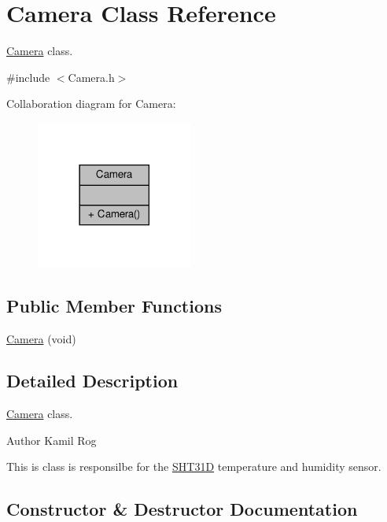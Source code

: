 \hypertarget{classCamera}{}\section{Camera Class Reference}
\label{classCamera}


\hyperlink{classCamera}{Camera} class.  




{\ttfamily \#include $<$Camera.\+h$>$}



Collaboration diagram for Camera\+:\nopagebreak
\begin{figure}[H]
\begin{center}
\leavevmode
\includegraphics[width=146pt]{classCamera__coll__graph}
\end{center}
\end{figure}
\subsection*{Public Member Functions}
\begin{DoxyCompactItemize}
\item 
\hyperlink{classCamera_a5c68f1ee8348320a6c47419ae2d724fb}{Camera} (void)
\end{DoxyCompactItemize}


\subsection{Detailed Description}
\hyperlink{classCamera}{Camera} class. 

\begin{DoxyAuthor}{Author}
Kamil Rog
\end{DoxyAuthor}
This is class is responsilbe for the \hyperlink{classSHT31D}{S\+H\+T31D} temperature and humidity sensor. 

\subsection{Constructor \& Destructor Documentation}
\mbox{\label{classCamera_a5c68f1ee8348320a6c47419ae2d724fb}} 
